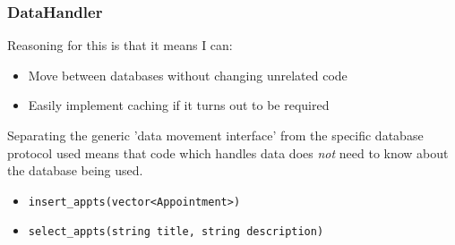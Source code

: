 \subsubsection{DataHandler}

Reasoning for this is that it means I can:

\begin{itemize}
    \item Move between databases without changing unrelated code
    \item Easily implement caching if it turns out to be required
\end{itemize}

Separating the generic 'data movement interface' from the specific database
protocol used means that code which handles data does \textit{not} need to know
about the database being used.

\begin{itemize}
    \item \verb+insert_appts(vector<Appointment>)+
    \item \verb+select_appts(string title, string description)+
\end{itemize}
